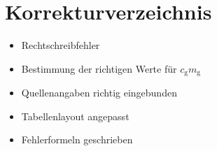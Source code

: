\section{Korrekturverzeichnis}
\label{sec:correction}
\begin{itemize}
      \item Rechtschreibfehler
      \item Bestimmung der richtigen Werte für $c_\text{g} m_\text{g}$
      \item Quellenangaben richtig eingebunden
      \item Tabellenlayout angepasst
      \item Fehlerformeln geschrieben
\end{itemize}
